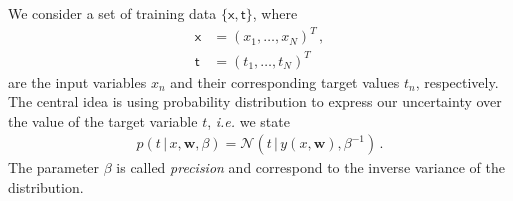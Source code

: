 \documentclass[11pt, DINA4, fleqn]{amsart}
\begin{document}
We consider a set of training data $\{\boldsymbol{\mathsf{x}}, \boldsymbol{\mathsf{t}}\}$, where
\begin{align}
\boldsymbol{\mathsf{x}} &= (x_1, \dots, x_N)^T \, , \\
\boldsymbol{\mathsf{t}} &= (t_1, \dots, t_N)^T
\end{align}
are the input variables $x_n$ and their corresponding target values $t_n$, respectively.
The central idea is using probability distribution to  express our uncertainty over the value of the target variable $t$, \textit{i.e.} we state
\begin{align}
p(t \, | \, x, \bm{w}, \beta) = \mathcal{N}\left(
t \, \bigl| \, y(x,\bm{w}), \beta^{-1}\right) \, .
\label{eq:tUncertainty}
\end{align}
The parameter $\beta$ is called \emph{precision} and correspond to the inverse variance of the distribution.
\end{document}
